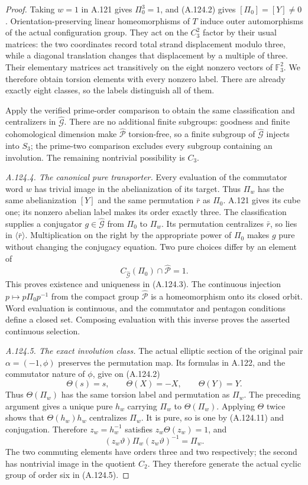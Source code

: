 \begin{proof}
Taking \(w=1\) in A.121 gives \(\Pi_0^3=1\), and (A.124.2) gives
\([\Pi_0]=[Y]\ne0\). Orientation-preserving linear homeomorphisms
of \(T\) induce outer automorphisms of the actual configuration
group. They act on the \(C_3^2\) factor by their usual matrices:
the two coordinates record total strand displacement modulo three,
while a diagonal translation changes that displacement by a multiple
of three. Their elementary matrices act transitively on the eight
nonzero vectors of \(\mathbb F_3^2\). We therefore obtain torsion
elements with every nonzero label. There are already exactly eight
classes, so the labels distinguish all of them.

Apply the verified prime-order comparison to obtain the same
classification and centralizers in \(\widehat{\mathcal G}\).
There are no additional finite subgroups: goodness and finite
cohomological dimension make \(\widehat{\mathcal P}\) torsion-free,
so a finite subgroup of \(\widehat{\mathcal G}\) injects into
\(S_3\); the prime-two comparison excludes every subgroup containing
an involution. The remaining nontrivial possibility is \(C_3\).

\emph{A.124.4. The canonical pure transporter.}
Every evaluation of the commutator word \(w\) has trivial image in
the abelianization of its target. Thus \(\Pi_w\) has the same
abelianization \([Y]\) and the same permutation \(\bar r\) as
\(\Pi_0\). A.121 gives its cube one; its nonzero abelian label
makes its order exactly three. The classification supplies a
conjugator \(g\in\widehat{\mathcal G}\) from \(\Pi_0\) to
\(\Pi_w\). Its permutation centralizes \(\bar r\), so lies in
\(\langle\bar r\rangle\). Multiplication on the right by the
appropriate power of \(\Pi_0\) makes \(g\) pure without changing
the conjugacy equation. Two pure choices differ by an element of
\[
 C_{\widehat{\mathcal G}}(\Pi_0)
             \cap\widehat{\mathcal P}=1.
 \tag{A.124.11}
\]
This proves existence and uniqueness in (A.124.3).
The continuous injection
\(p\mapsto p\Pi_0p^{-1}\) from the compact group
\(\widehat{\mathcal P}\) is a homeomorphism onto its closed orbit.
Word evaluation is continuous, and the commutator and pentagon
conditions define a closed set. Composing evaluation with this
inverse proves the asserted continuous selection.

\emph{A.124.5. The exact involution class.}
The actual elliptic section of the original pair
\(\alpha=(-1,\phi)\) preserves the permutation map.
Its formulas in A.122, and the commutator nature of \(\phi\),
give on (A.124.2)
\[
        \Theta(s)=s,\qquad \Theta(X)=-X,
                  \qquad \Theta(Y)=Y.
 \tag{A.124.12}
\]
Thus \(\Theta(\Pi_w)\) has the same torsion label and permutation
as \(\Pi_w\). The preceding argument gives a unique pure
\(h_w\) carrying \(\Pi_w\) to \(\Theta(\Pi_w)\).
Applying \(\Theta\) twice shows that
\(\Theta(h_w)h_w\) centralizes \(\Pi_w\). It is pure, so is one
by (A.124.11) and conjugation. Therefore \(z_w=h_w^{-1}\) satisfies
\(z_w\Theta(z_w)=1\), and
\[
 (z_w\vartheta)\Pi_w(z_w\vartheta)^{-1}=\Pi_w.
 \tag{A.124.13}
\]
The two commuting elements have orders three and two respectively;
the second has nontrivial image in the quotient \(C_2\).
They therefore generate the actual cyclic group of order six in
(A.124.5).


\end{proof}

